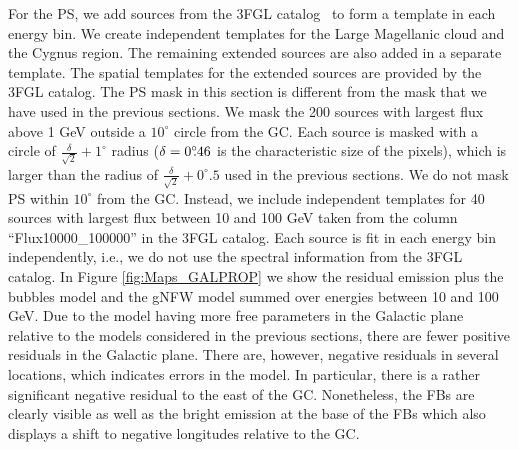 For the PS, we add sources from the 3FGL catalog~\citep{2015ApJS..218...23A} to form a template
in each energy bin.
We create independent templates for the Large Magellanic cloud and the Cygnus region.
The remaining extended sources are also added in a separate template.
The spatial templates for the extended sources are provided by the 3FGL catalog.
The PS mask in this section is different from the mask that we have used in the previous sections.
We mask the 200 sources with largest flux above 1 GeV outside a $10^\circ$ circle from the GC.
Each source is masked with a circle of $\frac{\delta}{\sqrt{2}} + 1^\circ$ radius ($\delta = 0^\circ\!\!.46$ is the characteristic size of the pixels),
which is larger than the radius of  $\frac{\delta}{\sqrt{2}} + 0^\circ\!\!.5$ used in the previous sections.
We do not mask PS within $10^\circ$ from the GC.
Instead, we include independent templates for 40 sources with largest flux between 10 and 100 GeV
taken from the column ``Flux10000\_100000'' in the 3FGL catalog.
Each source is fit in each energy bin independently, i.e., we do not use the spectral information from the 3FGL catalog.
In Figure \ref{fig:Maps_GALPROP} we show the residual emission plus the \Fermi bubbles model and the gNFW model summed over energies between 10 and 100 GeV.
Due to the model having more free parameters in the Galactic plane relative to the models considered in the previous sections,
there are fewer positive residuals in the Galactic plane.
There are, however, negative residuals in several locations, which indicates errors in the model. 
In particular, there is a rather significant negative residual to the east of the GC.
Nonetheless, the FBs are clearly visible as well as the bright emission at the base of the FBs which also displays a shift to negative
longitudes relative to the GC.


